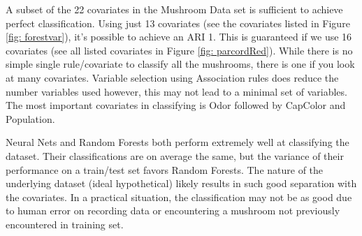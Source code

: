 \documentclass[float=false, crop=false]{standalone}
\begin{document}
A subset of the 22 covariates in the Mushroom Data set is sufficient to achieve perfect classification. Using just 13 covariates (see the covariates listed in Figure \ref{fig: forestvar}), it's possible to achieve an ARI 1. This is guaranteed if we use 16 covariates (see all listed covariates in Figure \ref{fig: parcordRed}). While there is no simple single rule/covariate to classify all the mushrooms, there is one if you look at many covariates.  Variable selection using Association rules does reduce the number variables used however, this may not lead to a minimal set of variables. The most important covariates in classifying is Odor followed by CapColor and Population. 

Neural Nets and Random Forests both perform extremely well at classifying the dataset. Their classifications are on average the same, but the variance of their performance on a train/test set favors Random Forests. The nature of the underlying dataset (ideal hypothetical) likely results in such good separation with the covariates. In a practical situation, the classification may not be as good due to human error on recording data or encountering a mushroom not previously encountered in training set. 

\newpage


\end{document}
